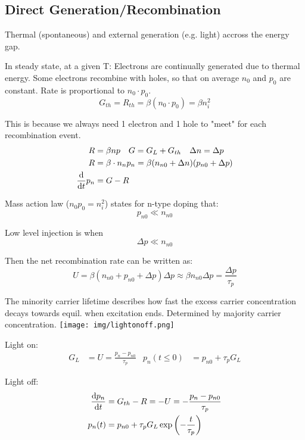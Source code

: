 \documentclass[a4paper, fontsize=8pt, landscape, DIV=1]{scrartcl}
\begin{document}
\begin{multicols*}{4}
  \subsection{Direct Generation/Recombination}

    \ifdefined\makeultracompact\else
      Thermal (spontaneous) and external generation (e.g. light) accross the energy gap.

      In steady state, at a given T: Electrons are continually generated due to thermal energy.
      Some electrons recombine with holes, so that on average $n_0$ and $p_0$ are constant. 
      Rate is proportional to $n_0 \cdot p_0$. 
    \fi
    \[G_{th} = R_{th} = \beta(n_0 \cdot p_0) = \beta n_i^2\]

    This is because we always need 1 electron and 1 hole to "meet" for each recombination event.
    \begin{align*}
      R &= \beta n p \quad G = G_L + G_{th} \quad \Delta n = \Delta p\\
      R &= \beta\cdot n_n p_n = \beta(n_{n0}+\Delta n)(p_{n0} + \Delta p)  \\
      \frac{\mathrm{d}}{\mathrm{d}t}p_n &= G-R
    \end{align*}

    Mass action law ($n_0p_0=n_i^2$) states for n-type doping that:
    \[p_{n0} \ll n_{n0}\]

    Low level injection is when
    \[\Delta p \ll n_{n0}\]

    Then the net recombination rate can be written as:
    \[U = \beta(n_{n0}+p_{n0}+\Delta p)\Delta p \approx \beta n_{n0}\Delta p = \frac{\Delta p}{\tau_p}\]

    \ifdefined\makeultracompact\else
      The minority carrier lifetime describes how fast the excess carrier concentration decays towards equil. when excitation ends. 
      Determined by majority carrier concentration.
    \fi
    \texttt{[image: img/lightonoff.png]}

    Light on:
    \begin{align*}
      G_L &= U = \frac{p_n-p_{n0}}{\tau_p} & p_n(t \leq 0) &= p_{n0} + \tau_pG_L
    \end{align*}

    Light off:
    \begin{align*}
      \frac{\mathrm{d}p_n}{\mathrm{d}t} &= G_{th} - R = -U = -\frac{p_n-p_{n0}}{\tau_p} \\
      p_n(t) &= p_{n0} + \tau_p G_L \exp\left(-\frac{t}{\tau_p}\right)
    \end{align*}


\end{multicols*}
\end{document}
